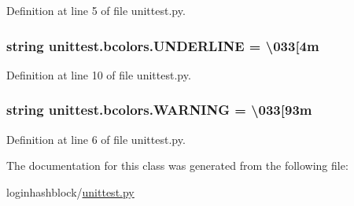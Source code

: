Definition at line 5 of file unittest.\+py.

\subsubsection[{\texorpdfstring{U\+N\+D\+E\+R\+L\+I\+NE}{UNDERLINE}}]{\setlength{\rightskip}{0pt plus 5cm}string unittest.\+bcolors.\+U\+N\+D\+E\+R\+L\+I\+NE = \textquotesingle{}\textbackslash{}033\mbox{[}4m\textquotesingle{}\hspace{0.3cm}{\ttfamily [static]}}\hypertarget{classunittest_1_1bcolors_ac181b1324b4847e254b738c74ef5fc00}{}\label{classunittest_1_1bcolors_ac181b1324b4847e254b738c74ef5fc00}


Definition at line 10 of file unittest.\+py.

\subsubsection[{\texorpdfstring{W\+A\+R\+N\+I\+NG}{WARNING}}]{\setlength{\rightskip}{0pt plus 5cm}string unittest.\+bcolors.\+W\+A\+R\+N\+I\+NG = \textquotesingle{}\textbackslash{}033\mbox{[}93m\textquotesingle{}\hspace{0.3cm}{\ttfamily [static]}}\hypertarget{classunittest_1_1bcolors_acc0c1f9b572e877f80e4017094d3de68}{}\label{classunittest_1_1bcolors_acc0c1f9b572e877f80e4017094d3de68}


Definition at line 6 of file unittest.\+py.



The documentation for this class was generated from the following file\+:\begin{DoxyCompactItemize}
\item 
loginhashblock/\hyperlink{unittest_8py}{unittest.\+py}\end{DoxyCompactItemize}
